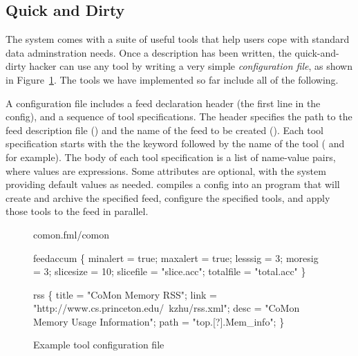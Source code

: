 \subsection{Quick and Dirty}
\label{sec:tools}
The \padsd{} system comes with a suite of useful tools that help users cope with standard data 
adminstration needs.  Once a \padsd{} description has been written, the quick-and-dirty
hacker can use any tool by writing a very simple {\em configuration file}, as shown in
Figure~\ref{fig:toolconfigs}.  
The tools we have implemented so far include all of the following.


A configuration file includes a feed declaration header 
(the first line in the config),
and a sequence of tool specifications. The header specifies the path to the 
feed description file () and the name of the feed to be created ().
Each tool specification starts with the the keyword  followed by the
name of the tool ( and  for example). The body of each tool specification 
is a list of name-value pairs, where values are \ocaml{} expressions. Some attributes are 
optional, with the system providing default values as needed. 
\padsd{} compiles a config into an \ocaml{} program that will create and archive the specified 
feed, configure the specified tools, and apply those tools to the feed in parallel.


\begin{figure}[tb]
\centering
\begin{codebox}
 comon.fml/comon

 feedaccum
\{
  minalert  = true;
  maxalert  = true;
  lesssig   = 3;
  moresig   = 3;
  slicesize = 10;
  slicefile = "slice.acc";
  totalfile = "total.acc"
\}

 rss
\{
  title = "CoMon Memory RSS";
  link  = "http://www.cs.princeton.edu/~kzhu/rss.xml";
  desc  = "CoMon Memory Usage Information";
  path  = "top.[?].Mem_info";
\}
\end{codebox}
\caption{Example tool configuration file}
\label{fig:toolconfigs}
\end{figure}






